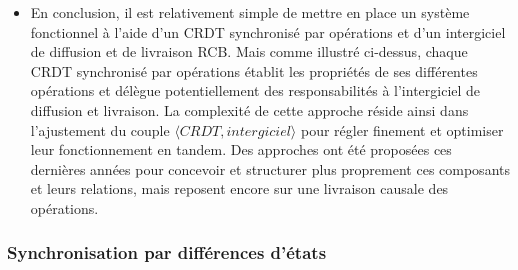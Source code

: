 \documentclass[12pt]{thesul}
\newtheorem{definition}{Définition}
\newcommand{\ie}{c.-à-d. }
\newcommand{\trm}[1]{\mathit{#1}}
\begin{document}
\begin{itemize}
    \begin{definition}[Stabilité causale]
      Une opération est stable causalement lorsqu'elle a été observée par l'ensemble des noeuds du système.
      Ainsi, toute opération future dépend causalement des opérations causalement stables, \ie les noeuds ne peuvent plus générer d'opérations concurrentes aux opérations causalement stables de manière honnête .
    \end{definition}
    Un mécanisme d'instantané  doit néanmoins être associé au mécanisme de troncage du journal pour générer un état équivalent à celui résultant des opérations supprimées.
    Ce mécanisme est en effet nécessaire pour permettre un nouveau noeud de rejoindre le système et d'obtenir l'état courant à partir de l'instantané et du journal tronqué.
  \item En conclusion, il est relativement simple de mettre en place un système fonctionnel à l'aide d'un \ac{CRDT} synchronisé par opérations et d'un intergiciel de diffusion et de livraison RCB.
    Mais comme illustré ci-dessus, chaque \ac{CRDT} synchronisé par opérations établit les propriétés de ses différentes opérations et délègue potentiellement des responsabilités à l'intergiciel de diffusion et livraison.
    La complexité de cette approche réside ainsi dans l'ajustement du couple $\langle \trm{CRDT}, \trm{intergiciel} \rangle$ pour régler finement et optimiser leur fonctionnement en tandem.
    Des approches \cite{baquero2017pure, 2021-improving-reactivity-pure-op-based-crdts-bauwens} ont été proposées ces dernières années pour concevoir et structurer plus proprement ces composants et leurs relations, mais reposent encore sur une livraison causale des opérations.
\end{itemize}

\subsubsection{Synchronisation par différences d'états}
\end{document}
